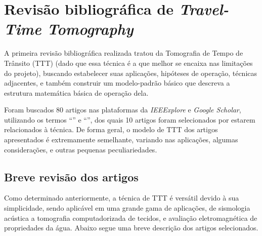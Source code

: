 \section{Revisão bibliográfica de \textsl{Travel-Time Tomography}}
\label{sec:travel-time_tomography}

A primeira revisão bibliográfica realizada tratou da Tomografia de Tempo de Trânsito (TTT) (dado que essa técnica é a que melhor se encaixa nas limitações do projeto), buscando estabelecer suas aplicações, hipóteses de operação, técnicas adjacentes, e também construir um modelo-padrão básico que descreva a estrutura matemática básica de operação dela.

Foram buscados 80 artigos nas plataformas da \textsl{IEEExplore} e \textsl{Google Scholar}, utilizando os termos ``'' e ``'', dos quais 10 artigos foram selecionados por estarem relacionados à técnica. De forma geral, o modelo de TTT dos artigos apresentados é extremamente semelhante, variando nas aplicações, algumas considerações, e outras pequenas peculiariedades.

\subsection{Breve revisão dos artigos}
\label{sec_ttt:subsec_revisao}
Como determinado anteriormente, a técnica de TTT é versátil devido à sua simplicidade, sendo aplicável em uma grande gama de aplicações, de sismologia acústica a tomografia computadorizada de tecidos, e avaliação eletromagnética de propriedades da água. Abaixo segue uma breve descrição dos artigos selecionados.

